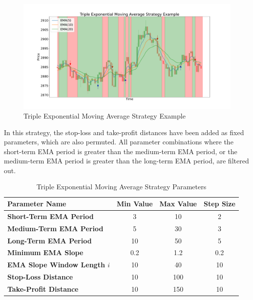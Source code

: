 \begin{figure}[H]
    \centering
    \includegraphics[width=\textwidth]{images/trading-strategies/ema-example}
    \caption{Triple Exponential Moving Average Strategy Example}
    \label{fig:ema-example}
\end{figure}

\noindent
In this strategy, the stop-loss and take-profit distances have been added as fixed parameters, which are also permuted.
All parameter combinations where the short-term EMA period is greater than the medium-term EMA period, or the medium-term EMA period is greater than the long-term EMA period, are filtered out.

\begin{table}[H]
    \centering
    \begin{tabular}{L{4cm}ccc}
        \toprule
        \textbf{Parameter Name} & Min Value & Max Value & Step Size
        \\
        \midrule
        \textbf{Short-Term EMA Period}       & 3   & 10  & 2   \\
        \textbf{Medium-Term EMA Period}      & 5   & 30  & 3   \\
        \textbf{Long-Term EMA Period}        & 10  & 50  & 5   \\
        \textbf{Minimum EMA Slope}           & 0.2 & 1.2 & 0.2 \\
        \textbf{EMA Slope Window Length $i$} & 10  & 40  & 10  \\
        \textbf{Stop-Loss Distance}          & 10  & 100 & 10  \\
        \textbf{Take-Profit Distance}        & 10  & 150 & 10  \\
        \bottomrule
    \end{tabular}
    \caption{Triple Exponential Moving Average Strategy Parameters}
    \label{tbl:ema-strategy-parameters}
\end{table}

